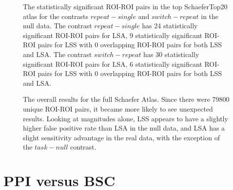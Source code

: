 \documentclass[phd,appendix,figures]{uithesis}
\begin{document}
\begin{figure}[H]
  \ContinuedFloat
  \centering


  \caption[All contrasts for all atlases for all data continued...]{
      The statistically significant ROI-ROI pairs in the top SchaeferTop20 atlas
      for the contrasts $repeat - single$ and $switch - repeat$ in the null data.
      The contrast $repeat - single$ has 24 statistically significant ROI-ROI
      pairs for LSA, 9 statistically significant ROI-ROI pairs
      for LSS with 0 overlapping ROI-ROI pairs for both LSS and LSA.
      The contrast $switch - repeat$ has 30 statistically significant ROI-ROI
      pairs for LSA, 6 statistically significant ROI-ROI pairs
      for LSS with 0 overlapping ROI-ROI pairs for both LSS and LSA.
  }
  \label{fig:significant-contrasts5}
\end{figure}

\begin{figure}[H]
  \centering


  \caption[LSS/LSA comparison using real data in the full Schaefer Atlas]{
      The overall results for the full Schaefer Atlas.
      Since there were 79800 unique ROI-ROI pairs, it became more likely
      to see unexpected results.
      Looking at magnitudes alone, LSS appears to have a slightly
      higher false positive rate than LSA in the null data, and 
      LSA has a slight sensitivity advantage in the real data, 
      with the exception of the $task - null$ contrast.
  }
  \label{fig:significant-contrasts6}
\end{figure}

\chapter{PPI versus BSC}
\end{document}
